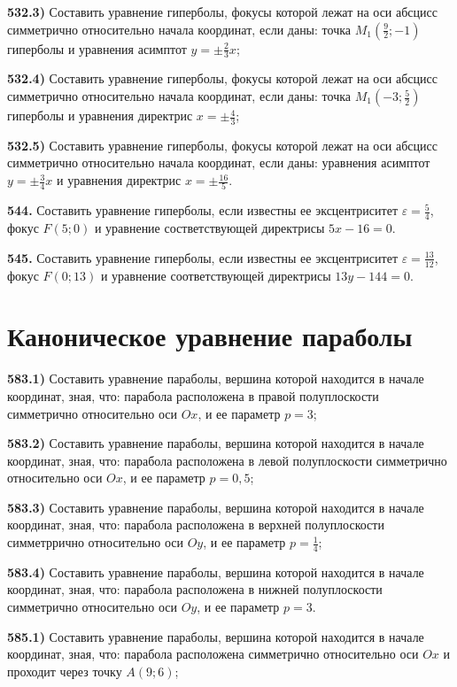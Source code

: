 \textbf{532.3)} Составить уравнение гиперболы, фокусы которой лежат на оси абсцисс симметрично относительно начала координат, если даны: точка $M_1\left(\frac{9}{2} ;-1\right)$ гиперболы и уравнения асимптот $y= \pm \frac{2}{3} x$;

\textbf{532.4)} Составить уравнение гиперболы, фокусы которой лежат на оси абсцисс симметрично относительно начала координат, если даны: точка $M_1\left(-3 ; \frac{5}{2}\right)$ гиперболы и уравнения директрис $x= \pm \frac{4}{3}$;

\textbf{532.5)} Составить уравнение гиперболы, фокусы которой лежат на оси абсцисс симметрично относительно начала координат, если даны: уравнения асимптот $y= \pm \frac{3}{4} x$ и уравнения директрис $x= \pm \frac{16}{5}$.

\textbf{544.} Составить уравнение гиперболы, если известны ее эксцентриситет $\varepsilon=\frac{5}{4}$, фокус $F(5 ; 0)$ и уравнение состветствующей директрисы $5 x-16=0$.

\textbf{545.} Составить уравнение гиперболы, если известны ее эксцентриситет $\varepsilon=\frac{13}{12}$, фокус $F(0 ; 13)$ и уравнение соответствующей директрисы $13 y-144=0$.



\section{Каноническое уравнение параболы}



\textbf{583.1)} Составить уравнение параболы, вершина которой находится в начале координат, зная, что: парабола расположена в правой полуплоскости симметрично относительно оси $O x$, и ее параметр $p=3$;

\textbf{583.2)} Составить уравнение параболы, вершина которой находится в начале координат, зная, что: парабола расположена в левой полуплоскости симметрично относительно оси $O x$, и ее параметр $p=0,5$;

\textbf{583.3)} Составить уравнение параболы, вершина которой находится в начале координат, зная, что: парабола расположена в верхней полуплоскости симметррично относительно оси $O y$, и ее параметр $p=\frac{1}{4}$;

\textbf{583.4)} Составить уравнение параболы, вершина которой находится в начале координат, зная, что: парабола расположена в нижней полуплоскости симметрично относительно оси $O y$, и ее параметр $p=3$.

\textbf{585.1)} Составить уравнение параболы, вершина которой находится в начале координат, зная, что: парабола расположена симметрично относительно оси $O x$ и проходит через точку $A(9 ; 6)$;

